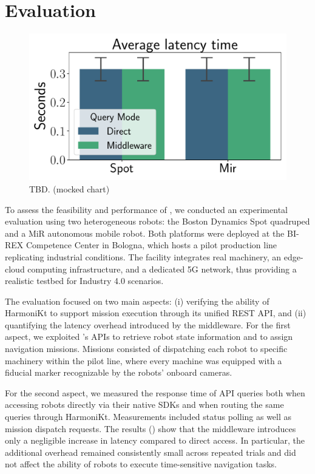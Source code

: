 \documentclass[conference]{IEEEtran}
\begin{document}
\section{Evaluation}\label{sec:eval}

\begin{figure}[htb]
    \centering
    \includegraphics[width=0.6\columnwidth]{images/latency.pdf}
    \caption{
        TBD. (mocked chart)
    }
    \label{fig:latency}
\end{figure}

To assess the feasibility and performance of \approach{}, 
 we conducted an experimental evaluation using two heterogeneous robots: 
 the Boston Dynamics Spot quadruped and a MiR autonomous mobile robot. 
% 
Both platforms were deployed at the BI-REX Competence Center in Bologna, 
 which hosts a pilot production line replicating industrial conditions. 
% 
The facility integrates real machinery, an edge-cloud computing infrastructure, 
 and a dedicated 5G network, thus providing a realistic testbed for Industry 4.0 scenarios.

The evaluation focused on two main aspects: 
 (i) verifying the ability of HarmoniKt to support mission execution through its unified REST API, and 
 (ii) quantifying the latency overhead introduced by the middleware. 
% 
For the first aspect, 
 we exploited \approach{}'s APIs to retrieve robot state information and to assign navigation missions. 
% 
Missions consisted of dispatching each robot to specific machinery within the pilot line, 
 where every machine was equipped with a fiducial marker recognizable by the robots' onboard cameras. 

For the second aspect, 
 we measured the response time of API queries both when accessing robots directly via their native SDKs 
 and when routing the same queries through HarmoniKt. 
%  
Measurements included status polling as well as mission dispatch requests. 
%
The results () show that the middleware introduces only a negligible increase in latency compared to direct access. 
%
In particular, 
 the additional overhead remained consistently small across repeated trials 
 and did not affect the ability of robots to execute time-sensitive navigation tasks.
\end{document}
